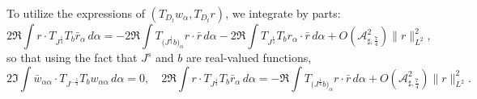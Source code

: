 \documentclass[10pt]{amsart}
\theoremstyle{remark}
\theoremstyle{definition}
\numberwithin{equation}{section}
\newcommand{\al}{\alpha}
\newcommand{\f}{\frac}
\newcommand{\ASSharp}{{\mathcal{A}_{\sharp,\frac{7}{4}}^2}}
\begin{document}
To utilize the expressions of $(T_{D_t}w_\al, T_{D_t}r)$, we integrate by parts:
\begin{equation*}
2\Re \int r\cdot T_{J^{\f14}}T_b\bar{r}_\alpha \, d\alpha = -2\Re \int T_{\big(J^{\f14}b\big)_\alpha}r\cdot \bar{r}\, d\alpha - 2\Re \int T_{J^{\f14}}T_{b}r_\alpha \cdot \bar{r}\, d\alpha  + O\left(\ASSharp\right) \|r\|_{L^2}^2,
\end{equation*}
so that using the fact that $J^s$ and $b$ are real-valued functions,
\begin{equation*}
2\Im \int \bar{w}_{\al \al}\cdot T_{J^{-\f54}}T_b w_{\al \al} \,d\alpha  =0,\quad 2\Re \int r\cdot T_{J^{\f14}}T_b\bar{r}_\alpha \, d\alpha = -\Re \int T_{\big(J^{\f14}b\big)_\alpha}r\cdot \bar{r}\, d\alpha  + O\left(\ASSharp\right) \|r\|_{L^2}^2.
\end{equation*}
\end{document}
